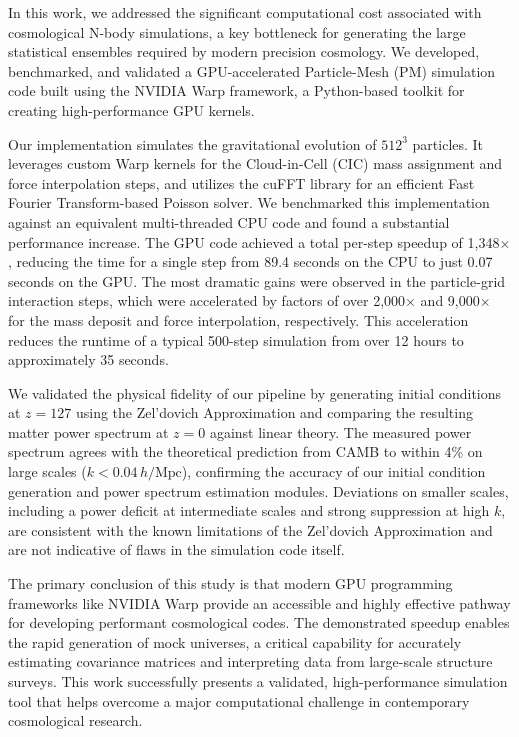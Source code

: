 \documentclass[]{article}
\begin{document}
In this work, we addressed the significant computational cost associated with cosmological N-body simulations, a key bottleneck for generating the large statistical ensembles required by modern precision cosmology. We developed, benchmarked, and validated a GPU-accelerated Particle-Mesh (PM) simulation code built using the NVIDIA Warp framework, a Python-based toolkit for creating high-performance GPU kernels.

Our implementation simulates the gravitational evolution of $512^3$ particles. It leverages custom Warp kernels for the Cloud-in-Cell (CIC) mass assignment and force interpolation steps, and utilizes the cuFFT library for an efficient Fast Fourier Transform-based Poisson solver. We benchmarked this implementation against an equivalent multi-threaded CPU code and found a substantial performance increase. The GPU code achieved a total per-step speedup of 1,348$\times$, reducing the time for a single step from 89.4 seconds on the CPU to just 0.07 seconds on the GPU. The most dramatic gains were observed in the particle-grid interaction steps, which were accelerated by factors of over 2,000$\times$ and 9,000$\times$ for the mass deposit and force interpolation, respectively. This acceleration reduces the runtime of a typical 500-step simulation from over 12 hours to approximately 35 seconds.

We validated the physical fidelity of our pipeline by generating initial conditions at $z=127$ using the Zel'dovich Approximation and comparing the resulting matter power spectrum at $z=0$ against linear theory. The measured power spectrum agrees with the theoretical prediction from CAMB to within 4\% on large scales ($k < 0.04 \, h/\text{Mpc}$), confirming the accuracy of our initial condition generation and power spectrum estimation modules. Deviations on smaller scales, including a power deficit at intermediate scales and strong suppression at high $k$, are consistent with the known limitations of the Zel'dovich Approximation and are not indicative of flaws in the simulation code itself.

The primary conclusion of this study is that modern GPU programming frameworks like NVIDIA Warp provide an accessible and highly effective pathway for developing performant cosmological codes. The demonstrated speedup enables the rapid generation of mock universes, a critical capability for accurately estimating covariance matrices and interpreting data from large-scale structure surveys. This work successfully presents a validated, high-performance simulation tool that helps overcome a major computational challenge in contemporary cosmological research.
\end{document}
